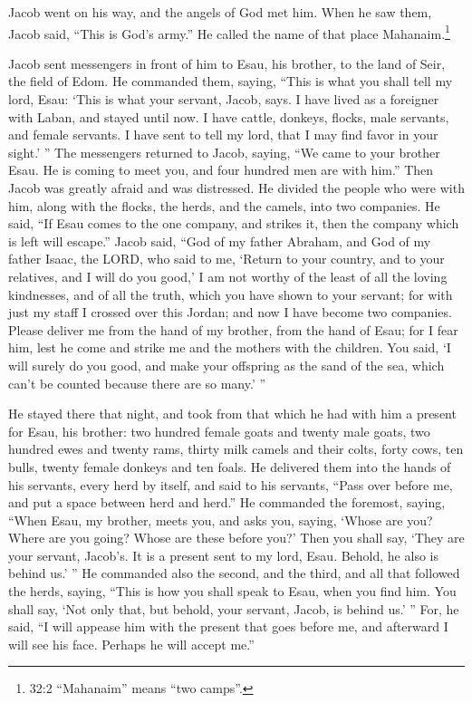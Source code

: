 \mychapter{}
\myverse*{}Jacob went on his way, and the angels of God met him. \myverse{}When he saw them, Jacob said, “This is God’s army.” He called the name of that place Mahanaim.\footnote{32:2 “Mahanaim” means “two camps”.}

\myverse{}Jacob sent messengers in front of him to Esau, his brother, to the land of Seir, the field of Edom. \myverse{}He commanded them, saying, “This is what you shall tell my lord, Esau: ‘This is what your servant, Jacob, says. I have lived as a foreigner with Laban, and stayed until now.  \myverse{}I have cattle, donkeys, flocks, male servants, and female servants. I have sent to tell my lord, that I may find favor in your sight.’ ” \myverse{}The messengers returned to Jacob, saying, “We came to your brother Esau. He is coming to meet you, and four hundred men are with him.” \myverse{}Then Jacob was greatly afraid and was distressed. He divided the people who were with him, along with the flocks, the herds, and the camels, into two companies. \myverse{}He said, “If Esau comes to the one company, and strikes it, then the company which is left will escape.” \myverse{}Jacob said, “God of my father Abraham, and God of my father Isaac, the LORD, who said to me, ‘Return to your country, and to your relatives, and I will do you good,’ \myverse{}I am not worthy of the least of all the loving kindnesses, and of all the truth, which you have shown to your servant; for with just my staff I crossed over this Jordan; and now I have become two companies. \myverse{}Please deliver me from the hand of my brother, from the hand of Esau; for I fear him, lest he come and strike me and the mothers with the children. \myverse{}You said, ‘I will surely do you good, and make your offspring as the sand of the sea, which can’t be counted because there are so many.’ ”

\myverse{}He stayed there that night, and took from that which he had with him a present for Esau, his brother: \myverse{}two hundred female goats and twenty male goats, two hundred ewes and twenty rams, \myverse{}thirty milk camels and their colts, forty cows, ten bulls, twenty female donkeys and ten foals. \myverse{}He delivered them into the hands of his servants, every herd by itself, and said to his servants, “Pass over before me, and put a space between herd and herd.” \myverse{}He commanded the foremost, saying, “When Esau, my brother, meets you, and asks you, saying, ‘Whose are you? Where are you going? Whose are these before you?’ \myverse{}Then you shall say, ‘They are your servant, Jacob’s. It is a present sent to my lord, Esau. Behold, he also is behind us.’ ” \myverse{}He commanded also the second, and the third, and all that followed the herds, saying, “This is how you shall speak to Esau, when you find him. \myverse{}You shall say, ‘Not only that, but behold, your servant, Jacob, is behind us.’ ” For, he said, “I will appease him with the present that goes before me, and afterward I will see his face. Perhaps he will accept me.”

